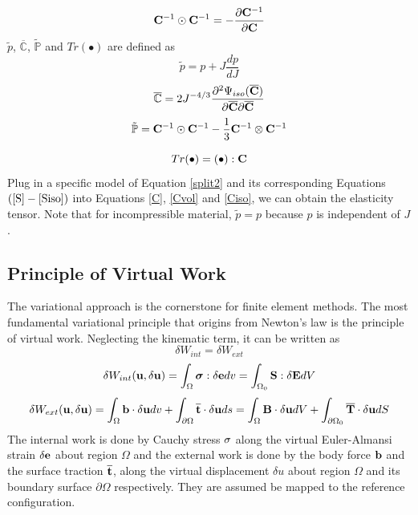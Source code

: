 \begin{equation} \label{circlecc}
\bold{C}^{-1}\odot\bold{C}^{-1} = - \frac{\partial{\bold{C}^{-1}}}{\partial{\bold{C}}}
\end{equation}
$\tilde{p}$, $\overline{\mathbb{C}}$, $\tilde{\mathbb{P}}$ and $Tr(\bullet)$ are defined as
\begin{equation} \label{tildep}
\tilde{p} = p + J\frac{dp}{dJ}
\end{equation}
\begin{equation} \label{barcc}
\overline{\mathbb{C}} = 2J^{-4/3}\frac{\partial^2\Psi_{iso}(\overline{\bold{C}})}{\partial{\overline{\bold{C}}}{\partial{\overline{\bold{C}}}}}
\end{equation}
\begin{equation} \label{tildepp}
\tilde{\mathbb{P}} = \bold{C}^{-1} \odot \bold{C}^{-1} -  \frac{1}{3}\bold{C}^{-1} \otimes \bold{C}^{-1} 
\end{equation}

\begin{equation} \label{tracec}
Tr(\bullet) = (\bullet) : \bold{C}
\end{equation}
Plug in a specific model of Equation \ref{split2} and its corresponding Equations $(\ref{S} - \ref{Siso})$ into Equations \ref{C}, \ref{Cvol} and \ref{Ciso}, we can obtain the elasticity tensor. Note that for incompressible material, $\tilde{p} = p$ because $p$ is independent of $J$.

%
\subsection{Principle of Virtual Work} \label{PVW}
The variational approach is the cornerstone for finite element methods. The most fundamental variational principle that origins from Newton's law is the principle of virtual work. Neglecting the kinematic term, it can be written as
\begin{equation} \label{basic}
\delta{W_{int}} = \delta{W_{ext}}
\end{equation}
\begin{equation} \label{Wint}
\delta W_{int}(\bold{u}, \delta\bold{u}) = \int_\Omega \boldsymbol\sigma : \delta\bold{e}dv = \int_{\Omega_{0}}\bold{S} : \delta\bold{E}dV
\end{equation}
\begin{equation} \label{Wext}
\delta W_{ext}(\bold{u}, \delta\bold{u}) = \int_\Omega\bold{b}\cdot\delta\bold{u}dv +  \int_{\partial\Omega}\overline{\bold{t}}\cdot\delta{\bold{u}}ds = \int_\Omega\bold{B}\cdot\delta\bold{u}dV +  \int_{\partial{\Omega_0}}\overline{\bold{T}}\cdot\delta{\bold{u}}dS
\end{equation}
The internal work is done by Cauchy stress $\bold\sigma$ along the virtual Euler-Almansi strain $\delta\bold{e}$ about region $\Omega$ and the external work is done by the body force $\bold{b}$ and the surface traction $\overline{\bold{t}}$, along the virtual displacement $\delta{u}$ about region $\Omega$ and its boundary surface $\partial\Omega$ respectively. They are assumed be mapped to the reference configuration. 

